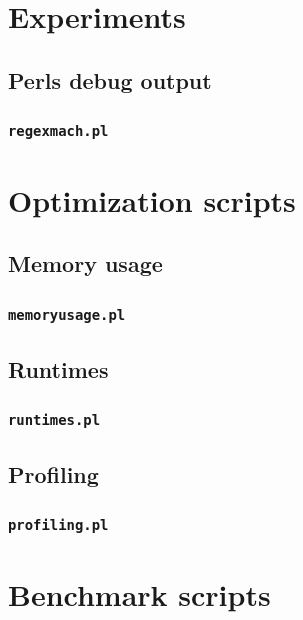 \section{Experiments}
\subsection{Perls debug output}
\subsubsection{\texttt{regexmach.pl}}
\label{sec:regexmach.pl}



\section{Optimization scripts}
\subsection{Memory usage}
\subsubsection{\texttt{memoryusage.pl}}
\label{sec:memoryusage.pl}


\subsection{Runtimes}
\subsubsection{\texttt{runtimes.pl}}
\label{sec:runtimes.pl}


\subsection{Profiling}
\subsubsection{\texttt{profiling.pl}}
\label{sec:profiling.pl}



\section{Benchmark scripts}
